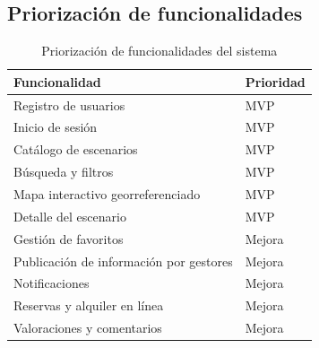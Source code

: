 \subsection{Priorizaci\'on de funcionalidades}

\begin{table}[H]
  \centering
  \caption{Priorizaci\'on de funcionalidades del sistema}
  \begin{tablaAPA}
    \begin{tabular}{@{}p{10.5cm}p{4.5cm}@{}}
      \toprule
      \textbf{Funcionalidad} & \textbf{Prioridad} \\
      \midrule
      Registro de usuarios & MVP \\
      Inicio de sesi\'on & MVP \\
      Cat\'alogo de escenarios & MVP \\
      B\'usqueda y filtros & MVP \\
      Mapa interactivo georreferenciado & MVP \\
      Detalle del escenario & MVP \\
      Gesti\'on de favoritos & Mejora \\
      Publicaci\'on de informaci\'on por gestores & Mejora \\
      Notificaciones & Mejora \\
      Reservas y alquiler en l\'inea & Mejora \\
      Valoraciones y comentarios & Mejora \\
      \bottomrule
    \end{tabular}
  \end{tablaAPA}
\end{table}
